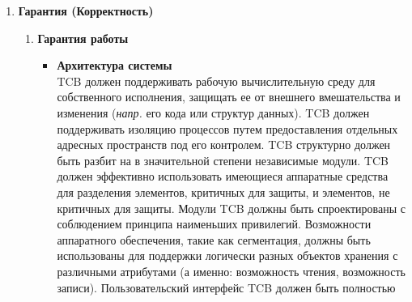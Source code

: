 \begin{enumerate}
\begin{enumerate}
\begin{enumerate}
\begin{enumerate}
				должен быть защищен средствами TCB таким образом, чтобы доступ на чтение был ограничен только уполномоченными на чтение журнала аудита. TCB должен регистрировать следующие события
				в системе: использование механизмов идентификации и аутентификации, передача объектов в пользовательское адресное пространство (\textit{напр.} открытие файла, запуск программы),
				удаление объектов, действия операторов и системных администраторов и/или сотрудников безопасности системы и другие события, связанные с безопасностью. Для каждого зарегистрированного
				события в журнале аудита должно быть указано: время и дата наступления события, пользователь, совершивший действие, тип события, результат события (успех/неудача). Для событий
				идентификации/аутентификации в журнале аудита должно быть указано происхождение запроса (\textit{прим. } кем инициировано событие) (\textit{напр.} идентификатор терминала). Для событий,
				вводящих объект в адресное пространство пользователя и удаляющих объект, запись в журнале аудита должна содержать имя объекта и его уровень конфиденциальности. Администратор
				системы должен иметь возможность выборочного аудита действия любого одного или нескольких пользователей системы на основе индивидуальной идентификации и/или уровне конфиденциальности объекта.
				TCB должен иметь возможность аудита событий для выявления использования скрытых каналов связи.
			\end{enumerate}
			\item{\textbf{Гарантия (Корректность)}}
			\begin{enumerate}
				\item{\textbf{Гарантия работы}}
				\begin{itemize}
					\item{\textbf{Архитектура системы}}\\
					TCB должен поддерживать рабочую вычислительную среду для собственного исполнения, защищать ее от внешнего вмешательства и изменения  (\textit{напр.} его кода или структур данных).
					TCB должен поддерживать изоляцию процессов путем предоставления отдельных адресных пространств под его контролем. TCB структурно должен быть разбит на в значительной степени
					независимые модули. TCB должен эффективно использовать имеющиеся аппаратные средства для разделения элементов, критичных для защиты, и элементов, не критичных для защиты.
					Модули TCB должны быть спроектированы с соблюдением принципа наименьших привилегий. Возможности аппаратного обеспечения, такие как сегментация, должны быть использованы
					для поддержки логически разных объектов хранения с различными атрибутами (а именно: возможность чтения, возможность записи). Пользовательский интерфейс TCB должен быть полностью

\end{itemize}
\end{enumerate}
\end{enumerate}
\end{enumerate}
\end{enumerate}
